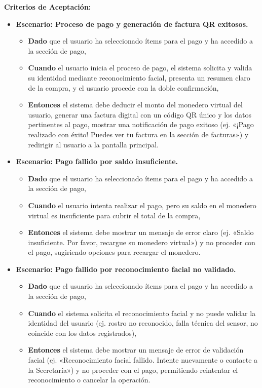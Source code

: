 \documentclass[12pt]{article}
\begin{document}
\textbf{Criterios de Aceptación:}
\begin{itemize}
	\item \textbf{Escenario: Proceso de pago y generación de factura QR exitosos.}
	\begin{itemize}
		\item \textbf{Dado} que el usuario ha seleccionado ítems para el pago y ha accedido a la sección de pago,
		\item \textbf{Cuando} el usuario inicia el proceso de pago, el sistema solicita y valida su identidad mediante reconocimiento facial, presenta un resumen claro de la compra, y el usuario procede con la doble confirmación,
		\item \textbf{Entonces} el sistema debe deducir el monto del monedero virtual del usuario, generar una factura digital con un código QR único y los datos pertinentes al pago, mostrar una notificación de pago exitoso (ej. «¡Pago realizado con éxito! Puedes ver tu factura en la sección de facturas») y redirigir al usuario a la pantalla principal.
	\end{itemize}

	\item \textbf{Escenario: Pago fallido por saldo insuficiente.}
	\begin{itemize}
		\item \textbf{Dado} que el usuario ha seleccionado ítems para el pago y ha accedido a la sección de pago,
		\item \textbf{Cuando} el usuario intenta realizar el pago, pero su saldo en el monedero virtual es insuficiente para cubrir el total de la compra,
		\item \textbf{Entonces} el sistema debe mostrar un mensaje de error claro (ej. «Saldo insuficiente. Por favor, recargue su monedero virtual») y no proceder con el pago, sugiriendo opciones para recargar el monedero.
	\end{itemize}

	\item \textbf{Escenario: Pago fallido por reconocimiento facial no validado.}
	\begin{itemize}
		\item \textbf{Dado} que el usuario ha seleccionado ítems para el pago y ha accedido a la sección de pago,
		\item \textbf{Cuando} el sistema solicita el reconocimiento facial y no puede validar la identidad del usuario (ej. rostro no reconocido, falla técnica del sensor, no coincide con los datos registrados),
		\item \textbf{Entonces} el sistema debe mostrar un mensaje de error de validación facial (ej. «Reconocimiento facial fallido. Intente nuevamente o contacte a la Secretaría») y no proceder con el pago, permitiendo reintentar el reconocimiento o cancelar la operación.
	\end{itemize}


\end{itemize}
\end{document}
